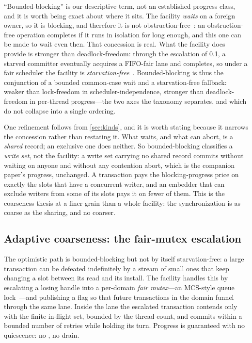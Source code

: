 \documentclass[11pt]{article}
\begin{document}
``Bounded-blocking'' is our descriptive term, not an established progress class,
and it is worth being exact about where it sits. The facility \emph{waits} on a
foreign owner, so it is blocking, and therefore it is not
obstruction-free~\citep{herlihy2003obstruction}: an obstruction-free operation
completes if it runs in isolation for long enough, and this one can be made to
wait even then. That concession is real. What the facility
does provide is stronger than deadlock-freedom: through the escalation of
\cref{sec:escalation}, a starved committer eventually acquires a FIFO-fair lane
and completes, so under a fair scheduler the facility is
\emph{starvation-free}~\citep{herlihy2011progress}. Bounded-blocking is thus the
conjunction of a bounded common-case wait and a starvation-free fallback: weaker
than lock-freedom in scheduler-independence, stronger than deadlock-freedom in
per-thread progress---the two axes the taxonomy separates, and which do not
collapse into a single ordering.

One refinement follows from \cref{sec:kinds}, and it is worth stating because it
narrows the concession rather than restating it. What waits, and what can abort,
is a \emph{shared} record; an exclusive one does neither. So bounded-blocking
classifies a \emph{write set}, not the facility: a write set carrying no shared
record commits without waiting on anyone and without any contention abort, which
is the companion paper's progress, unchanged. A transaction pays the
blocking-progress price on exactly the slots that have a concurrent writer, and
an embedder that can exclude writers from some of its slots pays it on fewer of
them. This is the coarseness thesis at a finer grain than a whole facility: the
synchronization is as coarse as the sharing, and no coarser.

\subsection{Adaptive coarseness: the fair-mutex escalation}
\label{sec:escalation}

The optimistic path is bounded-blocking but not by itself starvation-free: a
large transaction can be defeated indefinitely by a stream of small ones that
keep changing a slot between its read and its install. The facility handles this by
escalating a losing handle into a per-domain \emph{fair mutex}---an MCS-style
queue lock~\citep{mellorcrummey1991mcs}---and publishing a flag so that future
transactions in the domain funnel through the same lane. Inside the lane the
escalated transaction contends only with the finite in-flight set, bounded by the
thread count, and commits within a bounded number of retries while holding its
turn. Progress is guaranteed with no quiescence: no ,
no drain.
\end{document}
